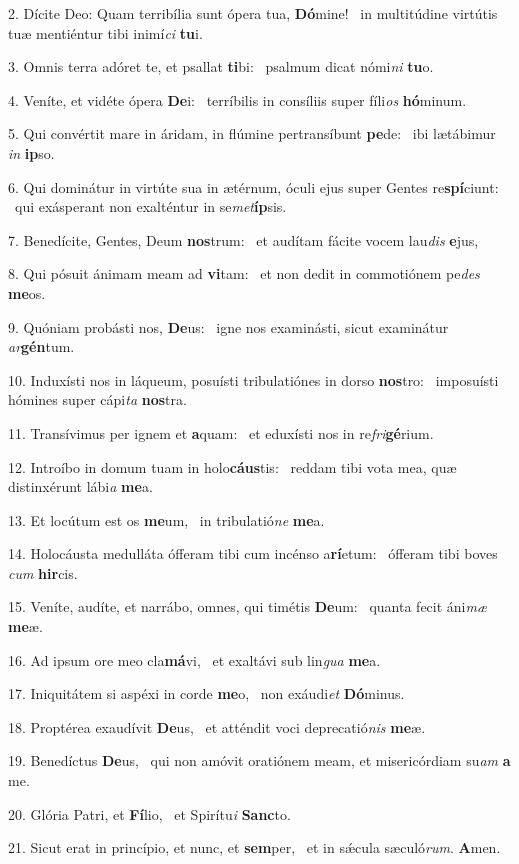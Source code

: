 2. Dícite Deo: Quam terribília sunt ópera tua, \textbf{Dó}mine! \ast\  in multitúdine virtútis tuæ mentiéntur tibi inimí\textit{ci} \textbf{tu}i.\

3. Omnis terra adóret te, et psallat \textbf{ti}bi: \ast\  psalmum dicat nómi\textit{ni} \textbf{tu}o.\

4. Veníte, et vidéte ópera \textbf{De}i: \ast\  terríbilis in consíliis super fíli\textit{os} \textbf{hó}minum.\

5. Qui convértit mare in áridam, in flúmine pertransíbunt \textbf{pe}de: \ast\  ibi lætábimur \textit{in} \textbf{ip}so.\

6. Qui dominátur in virtúte sua in ætérnum, óculi ejus super Gentes re\textbf{spí}ciunt: \ast\  qui exásperant non exalténtur in se\textit{met}\textbf{íp}sis.\

7. Benedícite, Gentes, Deum \textbf{nos}trum: \ast\  et audítam fácite vocem lau\textit{dis} \textbf{e}jus,\

8. Qui pósuit ánimam meam ad \textbf{vi}tam: \ast\  et non dedit in commotiónem pe\textit{des} \textbf{me}os.\

9. Quóniam probásti nos, \textbf{De}us: \ast\  igne nos examinásti, sicut examinátur \textit{ar}\textbf{gén}tum.\

10. Induxísti nos in láqueum, posuísti tribulatiónes in dorso \textbf{nos}tro: \ast\  imposuísti hómines super cápi\textit{ta} \textbf{nos}tra.\

11. Transívimus per ignem et \textbf{a}quam: \ast\  et eduxísti nos in re\textit{fri}\textbf{gé}rium.\

12. Introíbo in domum tuam in holo\textbf{cáus}tis: \ast\  reddam tibi vota mea, quæ distinxérunt lábi\textit{a} \textbf{me}a.\

13. Et locútum est os \textbf{me}um, \ast\  in tribulatió\textit{ne} \textbf{me}a.\

14. Holocáusta medulláta ófferam tibi cum incénso a\textbf{rí}etum: \ast\  ófferam tibi boves \textit{cum} \textbf{hir}cis.\

15. Veníte, audíte, et narrábo, omnes, qui timétis \textbf{De}um: \ast\  quanta fecit áni\textit{mæ} \textbf{me}æ.\

16. Ad ipsum ore meo cla\textbf{má}vi, \ast\  et exaltávi sub lin\textit{gua} \textbf{me}a.\

17. Iniquitátem si aspéxi in corde \textbf{me}o, \ast\  non exáudi\textit{et} \textbf{Dó}minus.\

18. Proptérea exaudívit \textbf{De}us, \ast\  et atténdit voci deprecatió\textit{nis} \textbf{me}æ.\

19. Benedíctus \textbf{De}us, \ast\  qui non amóvit oratiónem meam, et misericórdiam su\textit{am} \textbf{a} me.\

20. Glória Patri, et \textbf{Fí}lio, \ast\  et Spirítu\textit{i} \textbf{Sanc}to.\

21. Sicut erat in princípio, et nunc, et \textbf{sem}per, \ast\  et in sǽcula sæculó\textit{rum}. \textbf{A}men.\

